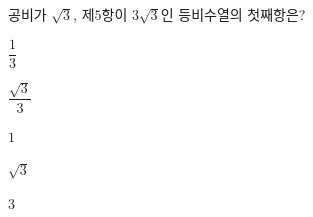 공비가 $\sqrt{3}$, 제$5$항이 $3\sqrt{3}$인 등비수열의 첫째항은?
\begin{choicesii}{\rule[-3ex]{0pt}{8ex}$\dfrac{1}{3}$}{\rule[-3ex]{0pt}{8ex}$\dfrac{\sqrt{3}}{3}$}{\rule[-3ex]{0pt}{8ex}$1$}{\rule[-3ex]{0pt}{8ex}$\sqrt{3}$}{\rule[-3ex]{0pt}{8ex}$3$}\end{choicesii}
